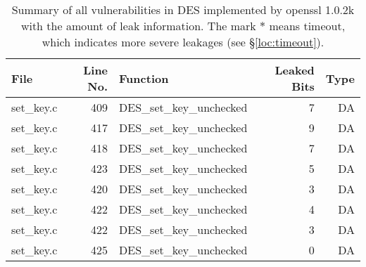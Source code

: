 \begin{table}%
\centering\tiny\scriptsize
\caption{Summary of all vulnerabilities in DES implemented by openssl 1.0.2k with the amount of leak information. The mark $*$ means timeout, which indicates more severe leakages (see \S\ref{loc:timeout}).}\label{tab:DESopenssl}
\begin{tabular}{lrlrr}
\hline
\textbf{File} & \textbf{Line No.} & \textbf{Function} & \textbf{Leaked Bits} & \textbf{Type} \\\hline
set\_key.c& 409&DES\_set\_key\_unchecked&7 &DA\\
set\_key.c& 417&DES\_set\_key\_unchecked&9 &DA\\
set\_key.c& 418&DES\_set\_key\_unchecked&7 &DA\\
set\_key.c& 423&DES\_set\_key\_unchecked&5 &DA\\
set\_key.c& 420&DES\_set\_key\_unchecked&3 &DA\\
set\_key.c& 422&DES\_set\_key\_unchecked&4 &DA\\
set\_key.c& 422&DES\_set\_key\_unchecked&3 &DA\\
set\_key.c& 425&DES\_set\_key\_unchecked&0 &DA\\
\hline
\end{tabular}
\end{table}